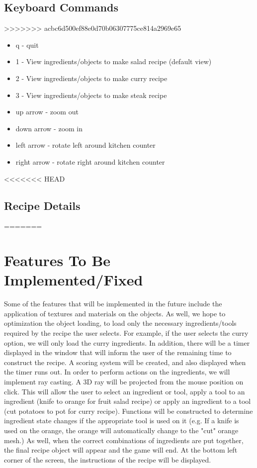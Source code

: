 \documentclass[11pt]{article}
\begin{document}
\subsection*{Keyboard Commands}
\label{sec:org1222e5e}
>>>>>>> acbc6d500ef88e0d70b06307775ce814a2969e65
\begin{itemize}
\item q - quit
\item 1 - View ingredients/objects to make salad recipe (default view)
\item 2 - View ingredients/objects to make curry recipe
\item 3 - View ingredients/objects to make steak recipe
\item up arrow - zoom out
\item down arrow - zoom in
\item left arrow - rotate left around kitchen counter
\item right arrow - rotate right around kitchen counter
\end{itemize}

<<<<<<< HEAD
\subsection*{Recipe Details}
\label{sec:org9f96562}
=======
\section*{Features To Be Implemented/Fixed}
\label{sec:orgcbba231}
Some of the features that will be implemented in the future include the application of textures and materials on the objects. As well, we hope to optimization the object loading, to load only the necessary ingredients/tools required by the recipe the user selects. For example, if the user selects the curry option, we will only load the curry ingredients. In addition, there will be a timer displayed in the window that will inform the user of the remaining time to construct the recipe. A scoring system will be created, and also displayed when the timer runs out. In order to perform actions on the ingredients, we will implement ray casting. A 3D ray will be projected from the mouse position on click. This will allow the user to select an ingredient or tool, apply a tool to an ingredient (knife to orange for fruit salad recipe) or apply an ingredient to a tool (cut potatoes to pot for curry recipe). Functions will be constructed to determine ingredient state changes if the appropriate tool is used on it (e.g. If a knife is used on the orange, the orange will automatically change to the "cut" orange mesh.) As well, when the correct combinations of ingredients are put together, the final recipe object will appear and the game will end. At the bottom left corner of the screen, the instructions of the recipe will be displayed.
\end{document}
